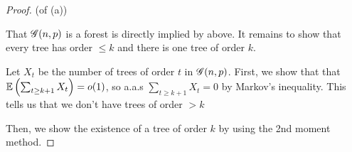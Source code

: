 \begin{proof}
    (of  (a))

    That $\operatorname{\mathscr{G}}(n, p)$ is a forest is directly implied by above.
    It remains to show that every tree has order $\leq k$ and there is one tree of order $k$.

    Let $X_t$ be the number of trees of order $t$ in $\operatorname{\mathscr{G}}(n, p)$.
    First, we show that that $\operatorname{\mathbb{E}} \left(\sum_{t \geq k + 1} X_t\right) = o(1)$, so a.a.s $\sum_{t \geq k + 1}X_t = 0$ by Markov's inequality.
    This tells us that we don't have trees of order $> k$

    Then, we show the existence of a tree of order $k$ by using the 2nd moment method.
\end{proof}